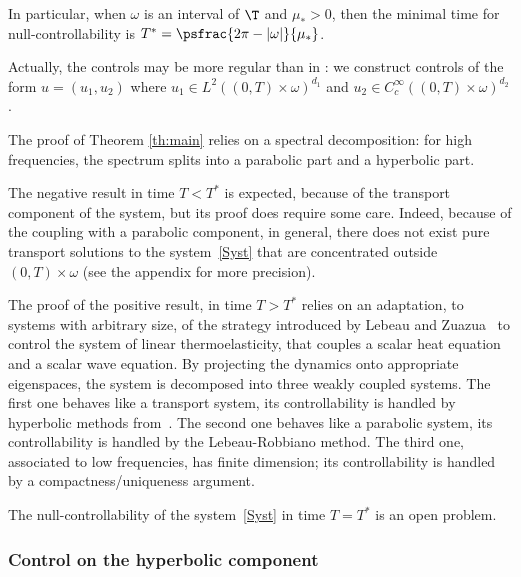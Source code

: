 In particular, when $\omega$ is an interval of $\T$ and $\mu_*>0$, then the minimal time for null-controllability is $T^\ast = \psfrac{2 \pi - |\omega|}{\mu_*}$.

Actually, the controls may be more regular than in : we construct controls of the form $u\!=\!(u_1,u_2)$ where $u_1\!\in\!L^2((0,T)\times\omega)^{d_1}$ and $u_2 \in C^\infty_c((0,T)\times\omega)^{d_2}$.

The proof of Theorem \ref{th:main} relies on a spectral decomposition: for high frequencies, the spectrum splits into a parabolic part and a hyperbolic part.

The negative result in time $T<T^\ast$ is expected, because of the transport component of the system, but its proof does require some care.
Indeed, because of the coupling with a parabolic component, in general, there does not exist pure transport solutions to the system~\eqref{Syst} that are concentrated outside $(0,T)\times\omega$ (see the appendix for more precision).

The proof of the positive result, in time $T>T^\ast$ relies on an adaptation, to systems with arbitrary size, of the strategy introduced by Lebeau and Zuazua~\cite{lebeau_1998} to control the system of linear thermoelasticity, that couples a scalar heat equation and a scalar wave equation. By projecting the dynamics onto appropriate eigenspaces, the system is decomposed into three weakly coupled systems. The first one behaves like a transport system, its controllability is handled by hyperbolic methods from~\cite{alabau-boussouira_2017}. The second one behaves like a parabolic system, its controllability is handled by the Lebeau-Robbiano method. The third one, associated to low frequencies, has finite dimension; its controllability is handled by a compactness/uniqueness argument.

The null-controllability of the system~\eqref{Syst} in time $T=T^\ast$ is an open problem.

\subsubsection{Control on the hyperbolic component}

